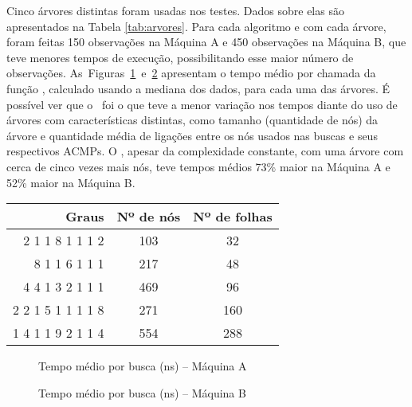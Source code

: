 


Cinco árvores distintas foram usadas nos testes.
Dados sobre elas são apresentados na Tabela \ref{tab:arvores}.
Para cada algoritmo e com cada árvore, foram feitas 150 observações na Máquina A e 450 observações na Máquina B, que teve menores tempos de execução, possibilitando esse maior número de observações.
As~Figuras~\ref{fig:t_medio_a}~e~\ref{fig:t_medio_b} apresentam o tempo médio por chamada da função \fACMP, calculado usando a mediana dos dados, para cada uma das árvores.
É possível ver que o \Novo\ foi o que teve a menor variação nos tempos diante do uso de árvores com características distintas, como tamanho (quantidade de nós) da árvore e quantidade média de ligações entre os nós usados nas buscas e seus respectivos ACMPs.
O \Matriz, apesar da complexidade constante, com uma árvore com cerca de cinco vezes mais nós, teve tempos médios 73\% maior na Máquina A e 52\% maior na Máquina B.

\begin{table}[htb]
	{%
	\begin{tabular}{rcc}
		\toprule
		Graus & Nº de nós & Nº de folhas \\
		\midrule 
		2 1 1 8 1 1 1 2
			& 103 & 32 \\
		8 1 1 6 1 1 1
			& 217 & 48 \\
		4 4 1 3 2 1 1 1
			& 469 & 96 \\
		2 2 1 5 1 1 1 1 8
			& 271 & 160 \\
		1 4 1 1 9 2 1 1 4
			& 554 & 288 \\
		\bottomrule
	\end{tabular}}{}%
\end{table}


\begin{figure}[h]
	\caption{Tempo médio por busca (ns) -- Máquina A}
	\label{fig:t_medio_a}
	\resizebox{\textwidth}{!}{}
\end{figure}

\begin{figure}[h]
	\caption{Tempo médio por busca (ns) -- Máquina B}
	\label{fig:t_medio_b}
	\resizebox{\textwidth}{!}{}
\end{figure}
